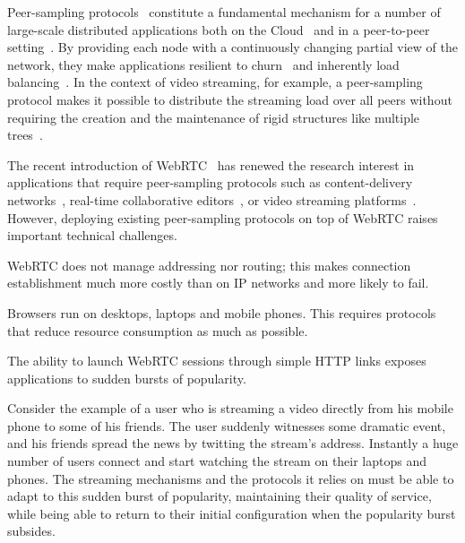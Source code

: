 \newcommand\SCALE{0.49}


Peer-sampling
protocols~\cite{jelasity2007gossip,tolgyeski2009adaptive,voulgaris2005cyclon}
constitute a fundamental mechanism for a number of large-scale
distributed applications both on the Cloud~\cite{decandia2007dynamo}
and in a peer-to-peer
setting~\cite{Frey09Middleware,voulgaris2005sub,wuhib2009robust}. By
providing each node with a continuously changing partial view of the
network, they make applications resilient to churn~\cite{bertier-d2ht}
and inherently load balancing~\cite{Frey09DSN}. In the context of
video streaming, for example, a peer-sampling protocol makes it
possible to distribute the streaming load over all peers without
requiring the creation and the maintenance of rigid structures like
multiple trees~\cite{Frey09DSN,monod:THESIS}.

The recent introduction of WebRTC~\cite{webrtc} has renewed the
research interest in applications that require peer-sampling protocols
such as content-delivery
networks~\cite{Zhang:2013:MBC:2465351.2465379}, real-time
collaborative editors~\cite{nedelec2016crate}, or video streaming
platforms~\cite{hivejs,smoothcache2}. However, deploying existing
peer-sampling protocols on top of WebRTC raises important technical
challenges.
\begin{inparaenum}[(1)]
\item WebRTC does not manage addressing nor routing; this makes
  connection establishment much more costly than on IP networks and
  more likely to fail. 
\item Browsers run on desktops, laptops and mobile phones. This
  requires protocols that reduce resource consumption as much as
  possible.
\item The ability to launch WebRTC sessions through simple HTTP links
  exposes applications to sudden bursts of popularity.
\end{inparaenum}
Consider the example of a user who is streaming a video directly from
his mobile phone to some of his friends. The user suddenly witnesses
some dramatic event, and his friends spread the news by twitting the
stream's address. Instantly a huge number of users connect and start
watching the stream on their laptops and phones. The streaming
mechanisms and the protocols it relies on must be able to adapt to
this sudden burst of popularity, maintaining their quality of service,
while being able to return to their initial configuration when the
popularity burst subsides. 

